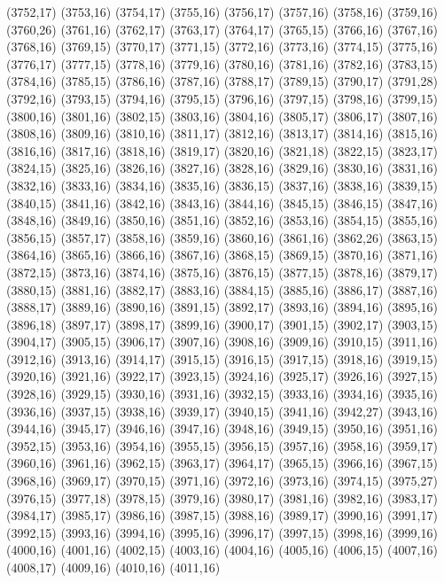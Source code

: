 (3752,17)
(3753,16)
(3754,17)
(3755,16)
(3756,17)
(3757,16)
(3758,16)
(3759,16)
(3760,26)
(3761,16)
(3762,17)
(3763,17)
(3764,17)
(3765,15)
(3766,16)
(3767,16)
(3768,16)
(3769,15)
(3770,17)
(3771,15)
(3772,16)
(3773,16)
(3774,15)
(3775,16)
(3776,17)
(3777,15)
(3778,16)
(3779,16)
(3780,16)
(3781,16)
(3782,16)
(3783,15)
(3784,16)
(3785,15)
(3786,16)
(3787,16)
(3788,17)
(3789,15)
(3790,17)
(3791,28)
(3792,16)
(3793,15)
(3794,16)
(3795,15)
(3796,16)
(3797,15)
(3798,16)
(3799,15)
(3800,16)
(3801,16)
(3802,15)
(3803,16)
(3804,16)
(3805,17)
(3806,17)
(3807,16)
(3808,16)
(3809,16)
(3810,16)
(3811,17)
(3812,16)
(3813,17)
(3814,16)
(3815,16)
(3816,16)
(3817,16)
(3818,16)
(3819,17)
(3820,16)
(3821,18)
(3822,15)
(3823,17)
(3824,15)
(3825,16)
(3826,16)
(3827,16)
(3828,16)
(3829,16)
(3830,16)
(3831,16)
(3832,16)
(3833,16)
(3834,16)
(3835,16)
(3836,15)
(3837,16)
(3838,16)
(3839,15)
(3840,15)
(3841,16)
(3842,16)
(3843,16)
(3844,16)
(3845,15)
(3846,15)
(3847,16)
(3848,16)
(3849,16)
(3850,16)
(3851,16)
(3852,16)
(3853,16)
(3854,15)
(3855,16)
(3856,15)
(3857,17)
(3858,16)
(3859,16)
(3860,16)
(3861,16)
(3862,26)
(3863,15)
(3864,16)
(3865,16)
(3866,16)
(3867,16)
(3868,15)
(3869,15)
(3870,16)
(3871,16)
(3872,15)
(3873,16)
(3874,16)
(3875,16)
(3876,15)
(3877,15)
(3878,16)
(3879,17)
(3880,15)
(3881,16)
(3882,17)
(3883,16)
(3884,15)
(3885,16)
(3886,17)
(3887,16)
(3888,17)
(3889,16)
(3890,16)
(3891,15)
(3892,17)
(3893,16)
(3894,16)
(3895,16)
(3896,18)
(3897,17)
(3898,17)
(3899,16)
(3900,17)
(3901,15)
(3902,17)
(3903,15)
(3904,17)
(3905,15)
(3906,17)
(3907,16)
(3908,16)
(3909,16)
(3910,15)
(3911,16)
(3912,16)
(3913,16)
(3914,17)
(3915,15)
(3916,15)
(3917,15)
(3918,16)
(3919,15)
(3920,16)
(3921,16)
(3922,17)
(3923,15)
(3924,16)
(3925,17)
(3926,16)
(3927,15)
(3928,16)
(3929,15)
(3930,16)
(3931,16)
(3932,15)
(3933,16)
(3934,16)
(3935,16)
(3936,16)
(3937,15)
(3938,16)
(3939,17)
(3940,15)
(3941,16)
(3942,27)
(3943,16)
(3944,16)
(3945,17)
(3946,16)
(3947,16)
(3948,16)
(3949,15)
(3950,16)
(3951,16)
(3952,15)
(3953,16)
(3954,16)
(3955,15)
(3956,15)
(3957,16)
(3958,16)
(3959,17)
(3960,16)
(3961,16)
(3962,15)
(3963,17)
(3964,17)
(3965,15)
(3966,16)
(3967,15)
(3968,16)
(3969,17)
(3970,15)
(3971,16)
(3972,16)
(3973,16)
(3974,15)
(3975,27)
(3976,15)
(3977,18)
(3978,15)
(3979,16)
(3980,17)
(3981,16)
(3982,16)
(3983,17)
(3984,17)
(3985,17)
(3986,16)
(3987,15)
(3988,16)
(3989,17)
(3990,16)
(3991,17)
(3992,15)
(3993,16)
(3994,16)
(3995,16)
(3996,17)
(3997,15)
(3998,16)
(3999,16)
(4000,16)
(4001,16)
(4002,15)
(4003,16)
(4004,16)
(4005,16)
(4006,15)
(4007,16)
(4008,17)
(4009,16)
(4010,16)
(4011,16)
